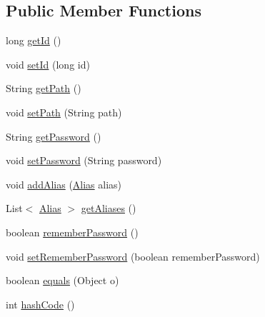 \subsection*{Public Member Functions}
\begin{DoxyCompactItemize}
\item 
long \hyperlink{classorg_1_1buildmlearn_1_1toolkit_1_1utilities_1_1Keystore_a048b20c740a55d66b6cb4fdca4ce95fb}{get\-Id} ()
\item 
void \hyperlink{classorg_1_1buildmlearn_1_1toolkit_1_1utilities_1_1Keystore_adec03f329a7c3b142bf46f70db1efa53}{set\-Id} (long id)
\item 
String \hyperlink{classorg_1_1buildmlearn_1_1toolkit_1_1utilities_1_1Keystore_a25ab70c2cf244222465fb5636862309a}{get\-Path} ()
\item 
void \hyperlink{classorg_1_1buildmlearn_1_1toolkit_1_1utilities_1_1Keystore_a3af36a851875e2c8044573b25a26ed77}{set\-Path} (String path)
\item 
String \hyperlink{classorg_1_1buildmlearn_1_1toolkit_1_1utilities_1_1Keystore_ad8582bdf60e41657863fbb0a94a5fcc0}{get\-Password} ()
\item 
void \hyperlink{classorg_1_1buildmlearn_1_1toolkit_1_1utilities_1_1Keystore_a621acd77ce8b88953239d96c4195e02e}{set\-Password} (String password)
\item 
void \hyperlink{classorg_1_1buildmlearn_1_1toolkit_1_1utilities_1_1Keystore_aea74578df4fce4ebefdfd58d81c5563b}{add\-Alias} (\hyperlink{classorg_1_1buildmlearn_1_1toolkit_1_1utilities_1_1Alias}{Alias} alias)
\item 
List$<$ \hyperlink{classorg_1_1buildmlearn_1_1toolkit_1_1utilities_1_1Alias}{Alias} $>$ \hyperlink{classorg_1_1buildmlearn_1_1toolkit_1_1utilities_1_1Keystore_a62162a7ce16401766620c0c9a2f7af66}{get\-Aliases} ()
\item 
boolean \hyperlink{classorg_1_1buildmlearn_1_1toolkit_1_1utilities_1_1Keystore_a2e2935672133a9b9f532199eb68f23bc}{remember\-Password} ()
\item 
void \hyperlink{classorg_1_1buildmlearn_1_1toolkit_1_1utilities_1_1Keystore_a1a367d77982e10aaffb6c59e91487592}{set\-Remember\-Password} (boolean remember\-Password)
\item 
boolean \hyperlink{classorg_1_1buildmlearn_1_1toolkit_1_1utilities_1_1Keystore_a5e6bcbcdcad101723cc8f22a09996490}{equals} (Object o)
\item 
int \hyperlink{classorg_1_1buildmlearn_1_1toolkit_1_1utilities_1_1Keystore_acb6c19ecbe0d7c98e0c8f3f4092e6ab8}{hash\-Code} ()
\end{DoxyCompactItemize}


